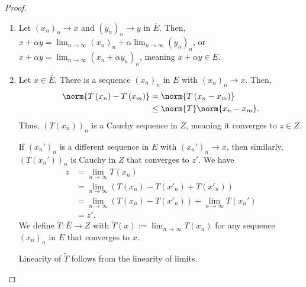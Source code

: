 \documentclass[10pt]{mypackage}
\begin{document}
\begin{proof}\hfill
  \begin{enumerate}[(1)]
    \item Let $\left(x_n\right)_n\rightarrow x$ and $\left(y_n\right)_n\rightarrow y$ in $\overline{E}$. Then, $x + \alpha y = \lim_{n\rightarrow\infty}\left(x_n\right)_n + \alpha \lim_{n\rightarrow\infty}\left(y_n\right)_n$, or $x + \alpha y = \lim_{n\rightarrow\infty}\left(x_n + \alpha y_n\right)_n$, meaning $x + \alpha y \in \overline{E}$.
    \item Let $x\in \overline{E}$. There is a sequence $\left(x_n\right)_{n}$ in $E$ with $\left(x_n\right)_n\rightarrow x$. Then,
      \begin{align*}
        \norm{T\left(x_n\right) - T\left(x_m\right)} &= \norm{T\left(x_n - x_m\right)}\\
                                                     &\leq \norm{T}\norm{x_n - x_m}.
      \end{align*}
      Thus, $\left(T\left(x_n\right)\right)_n$ is a Cauchy sequence in $Z$, meaning it converges to $z\in Z$.\newline

      If $\left(x_n'\right)_n$ is a different sequence in $E$ with $\left(x_n'\right)_n\rightarrow x$, then similarly, $\left(T\left(x_n'\right)\right)_n$ is Cauchy in $Z$ that converges to $z'$. We have
      \begin{align*}
        z &= \lim_{n\rightarrow \infty}T\left(x_n\right)\\
          &= \lim_{n\rightarrow\infty}\left(T\left(x_n\right) - T\left(x'_n\right) + T\left(x'_n\right)\right)\\
          &= \lim_{n\rightarrow\infty}\left(T\left(x_n\right) - T\left(x'_n\right)\right) + \lim_{n\rightarrow\infty}T\left(x_n'\right)\\
          &= z'.
      \end{align*}
      We define $\widetilde{T}: \overline{E}\rightarrow Z$ with $\widetilde{T}(x) := \lim_{n\rightarrow\infty}T\left(x_n\right)$ for any sequence $\left(x_n\right)_n$ in $E$ that converges to $x$.\newline

      Linearity of $\widetilde{T}$ follows from the linearity of limits.\newline


\end{enumerate}
\end{proof}
\end{document}
